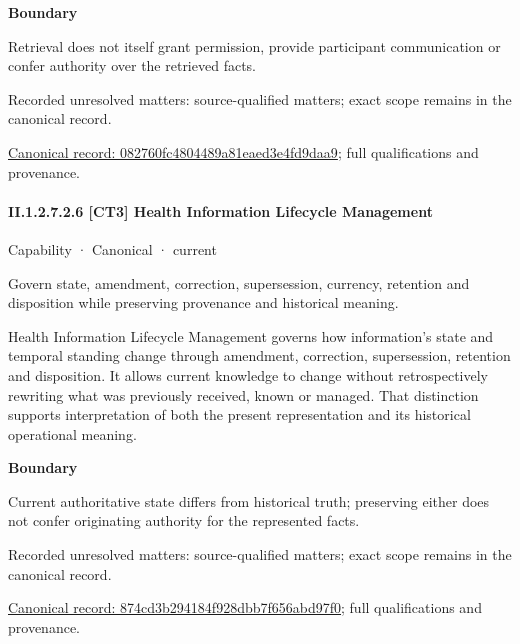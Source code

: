 \textbf{Boundary}



Retrieval does not itself grant permission, provide participant communication or confer authority over the retrieved facts.


{\small Recorded unresolved matters: source-qualified matters; exact scope remains in the canonical record.}\par
{\footnotesize \href{../../../../../../../continuum/strategy/capability/082760fc4804489a81eaed3e4fd9daa9.md}{Canonical record: 082760fc4804489a81eaed3e4fd9daa9}; full qualifications and provenance.}\par
\paragraph*{II.1.2.7.2.6 [CT3] Health Information Lifecycle Management}
\label{navigation:II.1.2.7.2.6}

\label{element:874cd3b294184f928dbb7f656abd97f0}
{\small Capability · Canonical · current}\par

Govern state, amendment, correction, supersession, currency, retention and disposition while preserving provenance and historical meaning.



Health Information Lifecycle Management governs how information's state and temporal standing change through amendment, correction, supersession, retention and disposition. It allows current knowledge to change without retrospectively rewriting what was previously received, known or managed. That distinction supports interpretation of both the present representation and its historical operational meaning.



\textbf{Boundary}



Current authoritative state differs from historical truth; preserving either does not confer originating authority for the represented facts.


{\small Recorded unresolved matters: source-qualified matters; exact scope remains in the canonical record.}\par
{\footnotesize \href{../../../../../../../continuum/strategy/capability/874cd3b294184f928dbb7f656abd97f0.md}{Canonical record: 874cd3b294184f928dbb7f656abd97f0}; full qualifications and provenance.}\par
